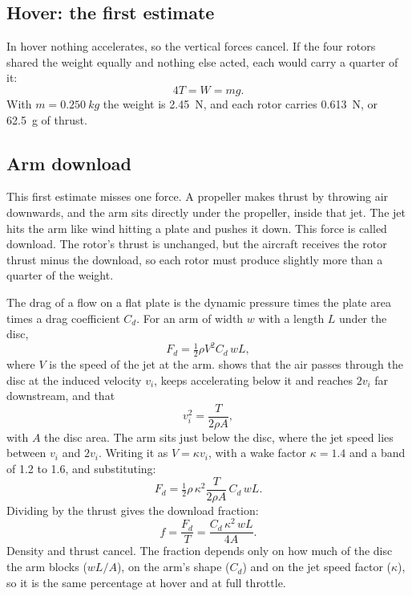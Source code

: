 \subsection{Hover: the first estimate}

In hover nothing accelerates, so the vertical forces cancel. If the four rotors shared the weight equally and nothing else acted, each would carry a quarter of it:
\begin{equation}
4T = W = mg.
\end{equation}
With $m = \SI{0.250}{kg}$ the weight is \SI{2.45}{N}, and each rotor carries \SI{0.613}{N}, or \SI{62.5}{g} of thrust.

\subsection{Arm download}

This first estimate misses one force. A propeller makes thrust by throwing air downwards, and the arm sits directly under the propeller, inside that jet. The jet hits the arm like wind hitting a plate and pushes it down. This force is called download. The rotor's thrust is unchanged, but the aircraft receives the rotor thrust minus the download, so each rotor must produce slightly more than a quarter of the weight.

The drag of a flow on a flat plate is the dynamic pressure times the plate area times a drag coefficient $C_d$. For an arm of width $w$ with a length $L$ under the disc,
\begin{equation}
F_d = \tfrac12 \rho V^2 C_d\, w L,
\end{equation}
where $V$ is the speed of the jet at the arm.  shows that the air passes through the disc at the induced velocity $v_i$, keeps accelerating below it and reaches $2v_i$ far downstream, and that
\begin{equation}
v_i^2 = \frac{T}{2\rho A},
\end{equation}
with $A$ the disc area. The arm sits just below the disc, where the jet speed lies between $v_i$ and $2v_i$. Writing it as $V = \kappa v_i$, with a wake factor $\kappa = 1.4$ and a band of 1.2 to 1.6, and substituting:
\begin{equation}
F_d = \tfrac12 \rho\, \kappa^2 \frac{T}{2\rho A}\, C_d\, w L.
\end{equation}
Dividing by the thrust gives the download fraction:
\begin{equation}
f = \frac{F_d}{T} = \frac{C_d\, \kappa^2\, w L}{4A}.
\end{equation}
Density and thrust cancel. The fraction depends only on how much of the disc the arm blocks ($wL/A$), on the arm's shape ($C_d$) and on the jet speed factor ($\kappa$), so it is the same percentage at hover and at full throttle.

